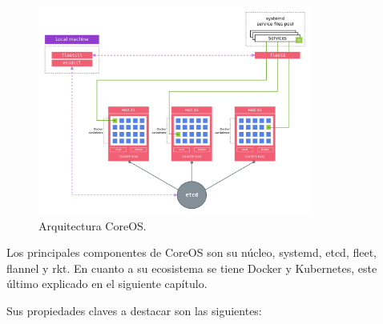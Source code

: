 \begin{figure}[H]
\centering
\includegraphics[width=0.8\textwidth]{images/figures/coreosarchitecture.png}
\caption{Arquitectura CoreOS.\label{fig:figure_placement_example}}
\end{figure}

Los principales componentes de CoreOS son su núcleo, systemd, etcd, fleet, flannel y rkt. En cuanto a su ecosistema se tiene Docker y Kubernetes, este último explicado en el siguiente capítulo.

Sus propiedades claves a destacar son las siguientes:

